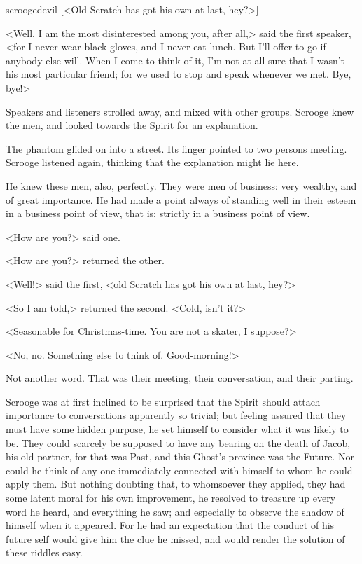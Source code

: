 \begin{colorbigpic}
	[\basicscale]
	{scroogedevil}
	[<Old Scratch has got his own at last, hey?>]
\end{colorbigpic}

<Well, I am the most disinterested among you, after all,> said the first speaker, <for I never wear black gloves, and I never eat lunch. But I'll offer to go if anybody else will. When I come to think of it, I'm not at all sure that I wasn't his most particular friend; for we used to stop and speak whenever we met. Bye, bye!>

Speakers and listeners strolled away, and mixed with other groups. Scrooge knew the men, and looked towards the Spirit for an explanation.

The phantom glided on into a street. Its finger pointed to two persons meeting. Scrooge listened again, thinking that the explanation might lie here.

He knew these men, also, perfectly. They were men of business: very wealthy, and of great importance. He had made a point always of standing well in their esteem in a business point of view, that is; strictly in a business point of view.

<How are you?> said one.

<How are you?> returned the other.

<Well!> said the first, <old Scratch has got his own at last, hey?>

<So I am told,> returned the second. <Cold, isn't it?>

<Seasonable for Christmas-time. You are not a skater, I suppose?>

<No, no. Something else to think of. Good-morning!>

Not another word. That was their meeting, their conversation, and their parting.

Scrooge was at first inclined to be surprised that the Spirit should attach importance to conversations apparently so trivial; but feeling assured that they must have some hidden purpose, he set himself to consider what it was likely to be. They could scarcely be supposed to have any bearing on the death of Jacob, his old partner, for that was Past, and this Ghost's province was the Future. Nor could he think of any one immediately connected with himself to whom he could apply them. But nothing doubting that, to whomsoever they applied, they had some latent moral for his own improvement, he resolved to treasure up every word he heard, and everything he saw; and especially to observe the shadow of himself when it appeared. For he had an expectation that the conduct of his future self would give him the clue he missed, and would render the solution of these riddles easy.

